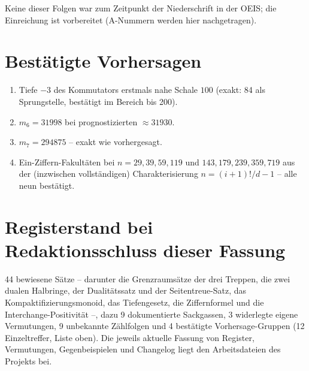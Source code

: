 Keine dieser Folgen war zum Zeitpunkt der Niederschrift in der
OEIS; die Einreichung ist vorbereitet (A-Nummern werden hier
nachgetragen).

\section*{Bestätigte Vorhersagen}

\begin{enumerate}
\item Tiefe $-3$ des Kommutators erstmals nahe Schale $100$
      (exakt: 84 als Sprungstelle, bestätigt im Bereich bis 200).
\item $m_6=31998$ bei prognostizierten $\approx31930$.
\item $m_7=294875$ -- exakt wie vorhergesagt.
\item Ein-Ziffern-Fakultäten bei $n=29,39,59,119$ und
      $143,179,239,359,719$ aus der (inzwischen vollständigen)
      Charakterisierung $n=(i{+}1)!/d-1$ -- alle neun bestätigt.
\end{enumerate}

\section*{Registerstand bei Redaktionsschluss dieser Fassung}

44 bewiesene Sätze -- darunter die Grenzraum\-sätze der drei
Treppen, die zwei dualen Halbringe, der Dualitäts\-satz und der
Seitentreue-Satz, das Kompaktifizierungs\-monoid, das
Tiefengesetz, die Ziffernformel und die Interchange-Positivität
--, dazu 9 dokumentierte Sackgassen, 3 widerlegte eigene
Vermutungen, 9 unbekannte Zählfolgen und 4 bestätigte
Vorhersage-Gruppen (12 Einzeltreffer, Liste oben). Die jeweils aktuelle Fassung von Register,
Vermutungen, Gegenbeispielen und Changelog liegt den Arbeitsdateien
des Projekts bei.
